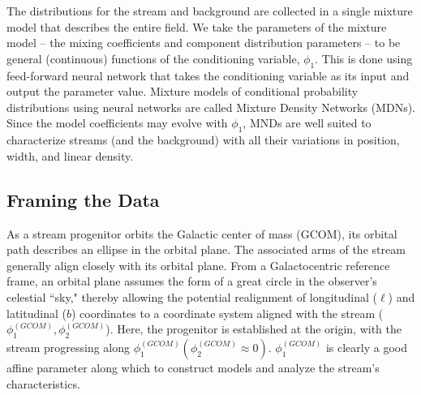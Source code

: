 \documentclass[twocolumn]{aastex631}
\newcommand{\smallcomponent}[2]{#2^{\scriptscriptstyle (#1)}}
\newcommand{\cmp}[2]{\smallcomponent{#1}{#2}}
\begin{document}
    The distributions for the stream and background are collected in a single
    mixture model that describes the entire field.  We take the parameters of
    the mixture model -- the mixing coefficients and component distribution
    parameters -- to be general (continuous) functions of the conditioning
    variable, $\phi_1$. This is done using feed-forward neural network that
    takes the conditioning variable as its input and output the parameter value.
    Mixture models of conditional probability distributions using neural
    networks are called Mixture Density Networks (MDNs). Since the model
    coefficients may evolve with $\phi_1$, MNDs are well suited to characterize
    streams (and the background) with all their variations in position, width,
    and linear density.



    \subsection{Framing the Data} \label{sub:method:framing_the_data}

        As a stream progenitor orbits the Galactic center of mass (GCOM), its
        orbital path describes an ellipse in the orbital plane. The associated
        arms of the stream generally align closely with its orbital plane.  From
        a Galactocentric reference frame, an orbital plane assumes the form of a
        great circle in the observer's celestial ``sky," thereby allowing the
        potential realignment of longitudinal ($\ell$) and latitudinal ($b$)
        coordinates to a coordinate system aligned with the stream
        ($\cmp{GCOM}{\phi_1}, \phi_2^{(GCOM)}$). Here, the progenitor is
        established at the origin, with the stream progressing along
        $\cmp{GCOM}{\phi_1} (\phi_2^{(GCOM)} \approx 0)$. $\cmp{GCOM}{\phi_1}$
        is clearly a good affine parameter along which to construct models and
        analyze the stream's characteristics.
\end{document}
